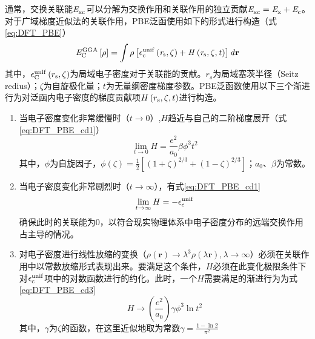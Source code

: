 通常，交换关联能$\it E_{\rm xc}^{\rm } \it$可以分解为交换作用和关联作用的独立贡献\chinesecolon $\it E_{\rm xc}^{\rm } \it=\it E_{\rm x}^{\rm } \it+\it E_{\rm c}^{\rm } \it$。对于广域梯度近似法的关联作用，PBE泛函使用如下的形式进行构造（式\eqref{eq:DFT_PBE}）\chinesecolon
\begin{equation}
    \label{eq:DFT_PBE}
    \it E_{\rm C}^{\rm GGA} \it\left[\rho\right]=\int \rho\left[\epsilon_{\rm c}^{\rm unif}\left(r_{\rm s},\zeta\right)+H\left(r_{\rm s},\zeta,t\right)\right] d{\mathbf r}
\end{equation}
其中，$\epsilon_{\rm C}^{\rm unif}\left(r_{\rm s},\zeta\right)$为局域电子密度对于关联能的贡献。$r_s$为局域塞茨半径（Seitz redius）；$\zeta$为自旋极化量；$t$为无量纲密度梯度参数。PBE泛函数使用以下三个渐进行为对泛函内电子密度的梯度贡献项$H\left(r_{\rm s},\zeta,t\right)$进行构造。

\begin{enumerate}[labelsep=0em,label=（\arabic*）,wide]
    \item 当电子密度变化非常缓慢时（$t\rightarrow 0$）,$H$趋近与自己的二阶梯度展开（式\eqref{eq:DFT_PBE_cd1}）\chinesecolon
    \begin{equation}
        \label{eq:DFT_PBE_cd1}
        \lim_{t\rightarrow0}H=\frac{e^2}{a_{0}}\beta\phi^3t^2
        \end{equation}
    其中，$\phi$为自旋因子，$\phi\left(\zeta\right)=\frac{1}{2}\left[\left(1+\zeta\right)^{2/ 3}+\left(1-\zeta\right)^{2/ 3}\right]$；$a_{0}$、$\beta$为常数。
    \item 当电子密度变化非常剧烈时（$t\rightarrow \infty$），有式\eqref{eq:DFT_PBE_cd1}
    \begin{equation}
        \label{eq:DFT_PBE_cd2}
        \lim_{t\rightarrow\infty}H=-\epsilon_{\rm c}^{\rm unif}
    \end{equation}
    确保此时的关联能为0，以符合现实物理体系中电子密度分布的远端交换作用占主导的情况。
    \item 对电子密度进行线性放缩的变换（$\rho\left({\bm r}\right)\rightarrow \lambda^3\rho(\lambda {\bm r}), \lambda\rightarrow \infty$）必须在关联作用中以常数放缩形式表现出来。要满足这个条件，$H$必须在此变化极限条件下对$\epsilon_{\rm c}^{\rm unif}$项中的对数函数进行的约化。此时，一个$H$需要满足的渐进行为为式\eqref{eq:DFT_PBE_cd3}
    \begin{equation}
        \label{eq:DFT_PBE_cd3}
        H\rightarrow\left(\frac{e^2}{a_0}\right)\gamma\phi^3\ln t^2
    \end{equation}
    其中，$\gamma$为$\zeta$的函数，在这里近似地取为常数$\gamma=\frac{1-\ln2}{\pi^2}$
\end{enumerate}

